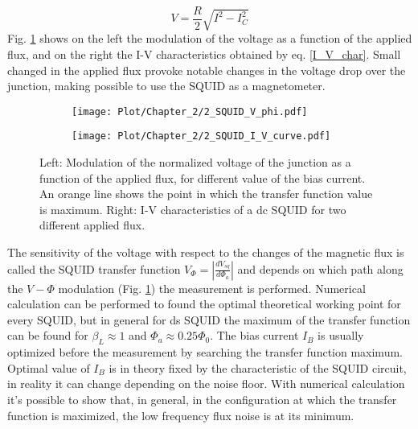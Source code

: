 \documentclass[12pt,a4paper]{report}
\begin{document}
    \begin{equation}
    	V = \frac{R}{2}\sqrt{I^2 - I_C^2}
    	\label{I_V_char}
    \end{equation}
    Fig. \ref{SQUID_V_modulation} shows on the left the modulation of the voltage as a function of the applied flux, and on the right the I-V characteristics obtained by eq. \ref{I_V_char}. Small changed in the applied flux provoke notable changes in the voltage drop over the junction, making possible to use the SQUID as a magnetometer.
    \begin{figure}[H]
    	\centering
    	\begin{subfigure}[b]{0.45\textwidth}
    		\centering
    		\texttt{[image: Plot/Chapter\_2/2\_SQUID\_V\_phi.pdf]}
    	\end{subfigure}
    	\hfill
    	\begin{subfigure}[b]{0.45\textwidth}
    		\centering
    		\texttt{[image: Plot/Chapter\_2/2\_SQUID\_I\_V\_curve.pdf]}
    	\end{subfigure}
    	\caption{Left: Modulation of the normalized voltage of the junction as a function of the applied flux, for different value of the bias current. An orange line shows the point in which the transfer function value is maximum. Right: I-V characteristics of a dc SQUID for two different applied flux.}
    	\label{SQUID_V_modulation}
    \end{figure}
    The sensitivity of the voltage with respect to the changes of the magnetic flux is called the SQUID transfer function $V_{\Phi} = |\frac{dV_{sq}}{d\Phi_a}|$ and depends on which path along the $V-\Phi$ modulation (Fig. \ref{SQUID_V_modulation}) the measurement is performed. Numerical calculation can be performed to found the optimal theoretical working point for every SQUID, but in general for ds SQUID the maximum of the transfer function can be found for $\beta_L \approx 1$ and $\Phi_a \approx 0.25 \Phi_0$. The bias current $I_B$ is usually optimized before the measurement by searching the transfer function maximum. Optimal value of $I_B$ is in theory fixed by the characteristic of the SQUID circuit, in reality it can change depending on the noise floor. With numerical calculation \Cite{Squid_handbook_1} it's possible to show that, in general, in the configuration at which the transfer function is maximized, the low frequency flux noise is at its minimum.
\end{document}
